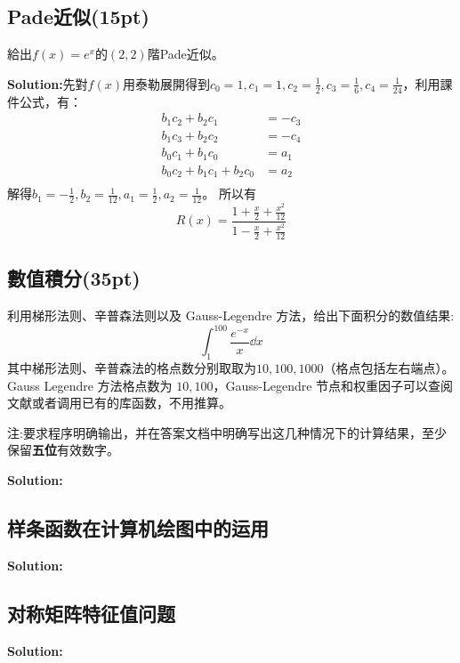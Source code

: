 \documentclass[12pt, a4paper, oneside]{article}
\begin{document}
\subsection{Pade近似(15pt)}
給出$f(x)=e^x$的$(2,2)$階Pade近似。



\textbf{Solution:}先對$f(x)$用泰勒展開得到$c_0=1, c_1=1, c_2=\frac12, c_3=\frac16, c_4=\frac{1}{24}$，利用課件公式，有：
\begin{align*}
    b_1c_2 + b_2c_1 &= -c_3 \\
    b_1c_3 + b_2c_2 &= -c_4 \\
    b_0c_1 + b_1c_0 &= a_1 \\
    b_0c_2 + b_1c_1 + b_2c_0 &= a_2 \\
\end{align*}
解得$b_1=-\frac{1}{2}, b_2=\frac{1}{12}, a_1=\frac12, a_2=\frac{1}{12}$。
所以有
$$R(x)=\frac{1 + \frac{x}{2}+\frac{x^2}{12}}{1-\frac{x}{2}+\frac{x^2}{12}}$$
\clearpage
\subsection{數值積分(35pt)}
利用梯形法则、辛普森法则以及 Gauss-Legendre 方法，给出下面积分的数值结果:
$$\int_1^{100}\frac{e^{-x}}{x}\dd x$$
其中梯形法则、辛普森法的格点数分别取取为$10,100,1000$（格点包括左右端点）。Gauss Legendre 方法格点数为 $10,100$，Gauss-Legendre 节点和权重因子可以查阅文献或者调用已有的库函数，不用推算。

注:要求程序明确输出，并在答案文档中明确写出这几种情况下的计算结果，至少保留\textbf{五位}有效数字。 


\textbf{Solution:}
\clearpage

\subsection{样条函数在计算机绘图中的运用}



\textbf{Solution:}
\clearpage
\subsection{对称矩阵特征值问题}


\textbf{Solution:}
\clearpage
\end{document}
